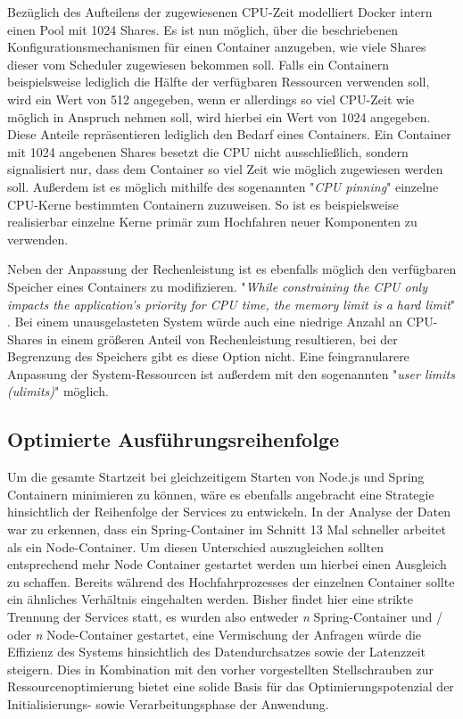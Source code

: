 Bezüglich des Aufteilens der zugewiesenen CPU-Zeit modelliert Docker intern einen Pool mit 1024 Shares. Es ist nun möglich, über die beschriebenen Konfigurationsmechanismen für einen Container anzugeben, wie viele Shares dieser vom Scheduler zugewiesen bekommen soll. Falls ein Containern beispielsweise lediglich die Hälfte der verfügbaren Ressourcen verwenden soll, wird ein Wert von 512 angegeben, wenn er allerdings so viel CPU-Zeit wie möglich in Anspruch nehmen soll, wird hierbei ein Wert von 1024 angegeben. Diese Anteile repräsentieren lediglich den Bedarf eines Containers. Ein Container mit 1024 angebenen Shares besetzt die CPU nicht ausschließlich, sondern signalisiert nur, dass dem Container so viel Zeit wie möglich zugewiesen werden soll. Außerdem ist es möglich mithilfe des sogenannten "\emph{CPU pinning}" einzelne CPU-Kerne bestimmten Containern zuzuweisen. So ist es beispielsweise realisierbar einzelne Kerne primär zum Hochfahren neuer Komponenten zu verwenden. 

Neben der Anpassung der Rechenleistung ist es ebenfalls möglich den verfügbaren Speicher eines Containers zu modifizieren. "\emph{While constraining the CPU only impacts the application’s priority for CPU time, the memory limit is a hard limit}" \cite[Seite~68 ff.]{oreilly-docker}. Bei einem unausgelasteten System würde auch eine niedrige Anzahl an CPU-Shares in einem größeren Anteil von Rechenleistung resultieren, bei der Begrenzung des Speichers gibt es diese Option nicht. Eine feingranularere Anpassung der System-Ressourcen ist außerdem mit den sogenannten "\emph{user limits (ulimits)}" möglich.

\subsection{Optimierte Ausführungsreihenfolge}
Um die gesamte Startzeit bei gleichzeitigem Starten von Node.js und Spring Containern minimieren zu können, wäre es ebenfalls angebracht eine Strategie hinsichtlich der Reihenfolge der Services zu entwickeln. In der Analyse der Daten war zu erkennen, dass ein Spring-Container im Schnitt 13 Mal schneller arbeitet als ein Node-Container. Um diesen Unterschied auszugleichen sollten entsprechend mehr Node Container gestartet werden um hierbei einen Ausgleich zu schaffen. Bereits während des Hochfahrprozesses der einzelnen Container sollte ein ähnliches Verhältnis eingehalten werden. Bisher findet hier eine strikte Trennung der Services statt, es wurden also entweder \emph{n} Spring-Container und / oder \emph{n} Node-Container gestartet, eine Vermischung der Anfragen würde die Effizienz des Systems hinsichtlich des Datendurchsatzes sowie der Latenzzeit steigern. Dies in Kombination mit den vorher vorgestellten Stellschrauben zur Ressourcenoptimierung bietet eine solide Basis für das Optimierungspotenzial der Initialisierungs- sowie Verarbeitungsphase der Anwendung.


